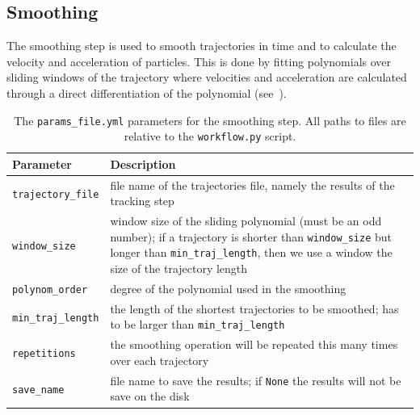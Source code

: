 \documentclass[10pt,a4paper]{article}
\begin{document}
\subsection{Smoothing}\label{sec:workflow_smooth}


The smoothing step is used to smooth trajectories in time and to calculate the velocity and acceleration of particles. This is done by fitting polynomials over sliding windows of the trajectory where velocities and acceleration are calculated through a direct differentiation of the polynomial (see~\cite{Luthi2005}).



\begin{table}[!ht]
	\centering
	\caption{The \texttt{params\_file.yml} parameters for the smoothing step. All paths to files are relative to the \texttt{workflow.py} script.}
	\begin{tabular}{l m{13cm}}
		\hline
		Parameter & Description\\
		\hline
		
		\texttt{trajectory\_file} & file name of the trajectories file, namely the results of the tracking step \\[.5em]
		
		\texttt{window\_size} & window size of the sliding polynomial (must be an odd number); if a trajectory is shorter than \texttt{window\_size} but longer than \texttt{min\_traj\_length}, then we use a window the size of the trajectory length \\[.5em]
		
		\texttt{polynom\_order} & degree of the polynomial used in the smoothing \\[.5em]
		
		\texttt{min\_traj\_length} & the length of the shortest trajectories to be smoothed; has to be larger than \texttt{min\_traj\_length} \\[.5em]
		
		\texttt{repetitions} & the smoothing operation will be repeated this many times over each trajectory \\[.5em]
				
		\texttt{save\_name} & file name to save the results; if \texttt{None} the results will not be save on the disk \\[.5em]
		
		\hline
	\end{tabular}
\end{table}

    
    
\end{document}
